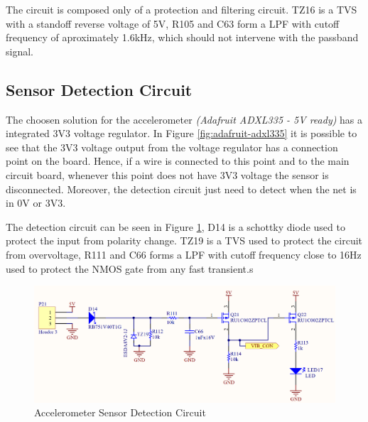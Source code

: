 	The circuit is composed only of a protection and filtering circuit. TZ16 is a TVS with a standoff reverse voltage of 5V, R105 and C63 form a LPF with cutoff frequency of aproximately 1.6kHz, which should not intervene with the passband signal.

\subsection{Sensor Detection Circuit}\label{ssec:accelerometer-sensor-detection-circuit}

	The choosen solution for the accelerometer \textit{(Adafruit ADXL335 - 5V ready)} has a integrated 3V3 voltage regulator. In Figure \ref{fig:adafruit-adxl335} it is possible to see that the 3V3 voltage output from the voltage regulator has a connection point on the board. Hence, if a wire is connected to this point and to the main circuit board, whenever this point does not have 3V3 voltage the sensor is disconnected. Moreover, the detection circuit just need to detect when the net is in 0V or 3V3.
	\par
	The detection circuit can be seen in Figure \ref{fig:accelerometer-sensor-detection-circuit}, D14 is a schottky diode used to protect the input from polarity change. TZ19 is a TVS used to protect the circuit from overvoltage, R111 and C66 forms a LPF with cutoff frequency close to 16Hz used to protect the NMOS gate from any fast transient.s

	\begin{figure}[htbp]
		\centering
			\includegraphics[scale=1]{figuras/fig-accelerometer-sensor-detection-circuit.png}
		\caption{Accelerometer Sensor Detection Circuit}
		\label{fig:accelerometer-sensor-detection-circuit}
	\end{figure}